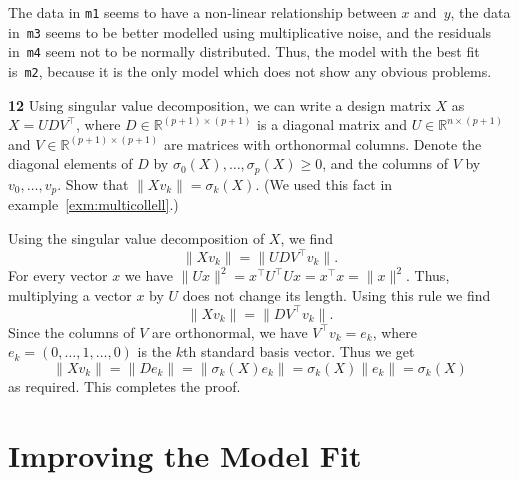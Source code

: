 \documentclass[
  a4paper,
]{article}
\theoremstyle{definition}
\theoremstyle{definition}
\theoremstyle{definition}
\theoremstyle{definition}
\theoremstyle{remark}
\begin{document}
\begin{myanswers}
The data in \texttt{m1} seems to
have a non-linear relationship between \(x\) and~\(y\), the data
in~\texttt{m3} seems to be better modelled using multiplicative noise,
and the residuals in~\texttt{m4} seem not to be normally
distributed. Thus, the model with the best fit is~\texttt{m2},
because it is the only model which does not show any obvious
problems.

\end{myanswers}

\textbf{12} Using singular value decomposition,
we can write a design matrix \(X\) as \(X = U D V^\top\),
where \(D\in\mathbb{R}^{(p+1)\times(p+1)}\) is a diagonal matrix
and \(U\in\mathbb{R}^{n\times(p+1)}\) and \(V\in\mathbb{R}^{(p+1)\times(p+1)}\) are matrices with orthonormal columns.
Denote the diagonal elements of \(D\) by \(\sigma_0(X), \ldots, \sigma_p(X) \geq 0\),
and the columns of \(V\) by \(v_0, \ldots, v_p\).
Show that \(\| X v_k \| = \sigma_k(X)\).
(We used this fact in example~\ref{exm:multicollell}.)

\begin{myanswers}
Using the singular value decomposition of \(X\), we find
\begin{equation*}
  \| X v_k \|
  = \| U D V^\top v_k \|.
\end{equation*}
For every vector \(x\) we
have \(\| U x \|^2 = x^\top U^\top U x = x^\top x = \| x \|^2\).
Thus, multiplying a vector \(x\) by \(U\) does
not change its length. Using this rule we find
\begin{equation*}
  \| X v_k \|
  = \| D V^\top v_k \|.
\end{equation*}
Since the columns of \(V\) are orthonormal, we have \(V^\top v_k = e_k\),
where \(e_k = (0, \ldots, 1, \ldots, 0)\) is the \(k\)th standard basis vector.
Thus we get
\begin{equation*}
  \| X v_k \|
  = \| D e_k \|
  = \| \sigma_k(X) e_k \|
  = \sigma_k(X) \| e_k \|
  = \sigma_k(X)
\end{equation*}
as required. This completes the proof.

\end{myanswers}

\clearpage

\hypertarget{S11-improving}{%
\section{Improving the Model Fit}\label{S11-improving}}
\end{document}
